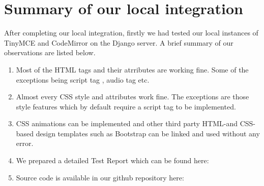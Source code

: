 \section{Summary of our local integration}
After completing our local integration, firstly we had tested our local instances of
TinyMCE and CodeMirror on the Django server. A brief summary of our observations are
listed below.
\begin{enumerate}
\item Most of the HTML tags and their atrributes are working fine. Some of the exceptions
being script tag , audio tag etc.
\item Almost every CSS style and attributes work fine. The exceptions are those style features
which by default require a script tag to be implemented.
\item CSS animations can be implemented and other third party HTML-and CSS-based design
templates such as Bootstrap can be linked and used without any error.
\item We prepared a detailed Test Report which can be found here:\newline[\url{https://docs.google.com/spreadsheets/d/1AJQWfAG2NIjpxFZt2fnLPlKdhP2-q35KZ0DOmdb-F0w/edit#gid=0}]
\item  Source code is available in our github repository here:
\end{enumerate}


